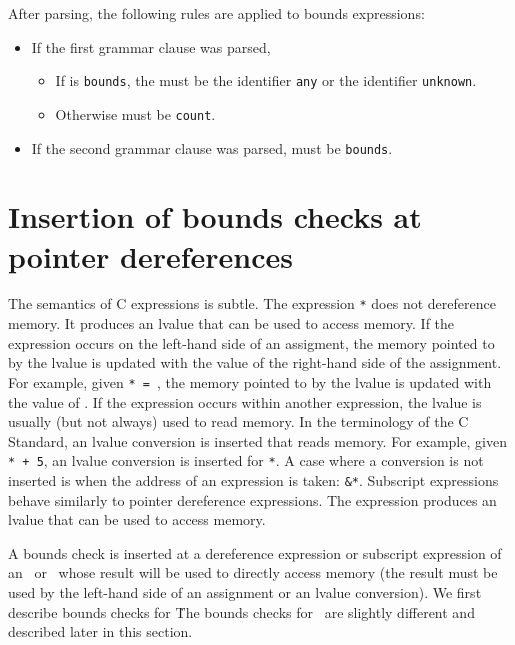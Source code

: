 After parsing, the following rules are applied to bounds
expressions:
\begin{itemize}
\item If the first grammar clause was parsed,
\begin{itemize}
\item If  is \texttt{bounds}, the 
must be the identifier \texttt{any} or the identifier \texttt{unknown}.
\item Otherwise  must be \texttt{count}.
\end{itemize}
\item If the second grammar clause was parsed,  must be
\texttt{bounds}.
\end{itemize}

\section{Insertion of bounds checks at pointer dereferences}

\label{section:bounds-checking-indirections}
The semantics of C expressions is subtle.  The expression
\texttt{*} does not dereference memory.  It
produces an lvalue that can be used to access memory. If the expression
occurs on the left-hand side of an assigment, the memory pointed to
by the lvalue is updated with the value of the right-hand side of
the assignment.
For example, given \texttt{* = },
the memory pointed to by the lvalue is updated with the value of .
If the expression occurs within another expression, the lvalue is usually
(but not always)  used to read memory.  In the terminology of the C Standard,
an lvalue conversion is inserted that reads memory. For example, given \texttt{* + 5},
an lvalue conversion is inserted for \texttt{*}.  A case where a
conversion is not inserted is  when the address of an expression is taken:
\texttt{\&*}. Subscript expressions behave similarly to pointer
dereference expressions.  The expression \texttt{} produces
an lvalue that can be used to access memory.

A bounds check is inserted at a dereference expression or subscript expression
of an \arrayptr\ or \ntarrayptr\ whose result will be used to directly
access memory (the result must be used by the left-hand side of an
assignment or an lvalue conversion).   We first describe bounds checks
for \arrayptr\.   The bounds checks for \ntarrayptr\ are slightly
different and described later in this section.

